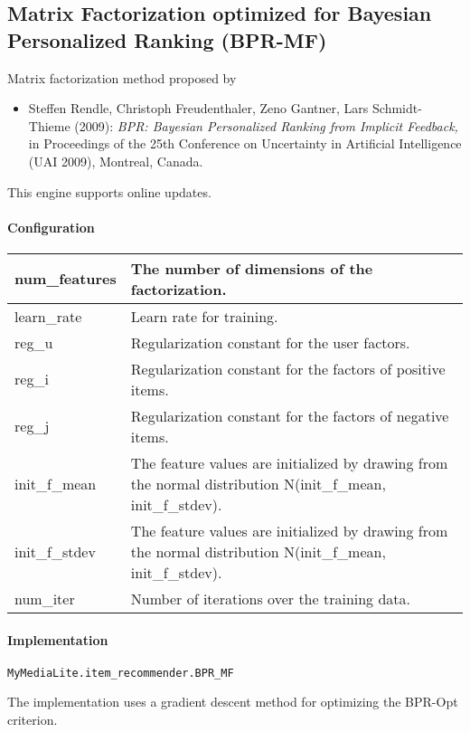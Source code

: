 \documentclass[]{report}
\begin{document}
\subsection[Matrix Factorization optimized for Bayesian Personalized
Ranking (BPR{}-MF)]{Matrix Factorization optimized for Bayesian
Personalized Ranking (BPR-MF)}
Matrix factorization method proposed by 

\begin{itemize}
\item {
Steffen Rendle, Christoph Freudenthaler, Zeno Gantner, Lars
Schmidt-Thieme (2009): \textit{BPR: Bayesian Personalized
Ranking from Implicit Feedback, }in Proceedings of the 25th Conference
on Uncertainty in Artificial Intelligence (UAI 2009), Montreal,
Canada.}
\end{itemize}

This engine supports online updates.

\paragraph[Configuration]{Configuration}
\hypertarget{RefHeading1151696489703}{}\begin{flushleft}
\tablehead{}
\begin{supertabular}{|m{1.6712599in}|m{4.6781597in}|}
\hline
 num\_features &
 The number of dimensions of the
factorization.\\\hline
 learn\_rate &
 Learn rate for training.\\\hline
 reg\_u &
 Regularization constant for the user
factors.\\\hline
 reg\_i &
 Regularization constant for the
factors of positive items.\\\hline
 reg\_j &
 Regularization constant for the
factors of negative items.\\\hline
 init\_f\_mean &
 The feature values are initialized by
drawing from the normal distribution N(init\_f\_mean,
init\_f\_stdev).\\\hline
 init\_f\_stdev &
 The feature values are initialized by
drawing from the normal distribution N(init\_f\_mean,
init\_f\_stdev).\\\hline
 num\_iter &
 Number of iterations over the training
data.\\\hline
\end{supertabular}
\end{flushleft}

\paragraph[Implementation]{Implementation}
\texttt{MyMediaLite.item\_recommender.BPR\_MF}

The implementation uses a gradient descent method for optimizing the
BPR-Opt criterion.
\end{document}
